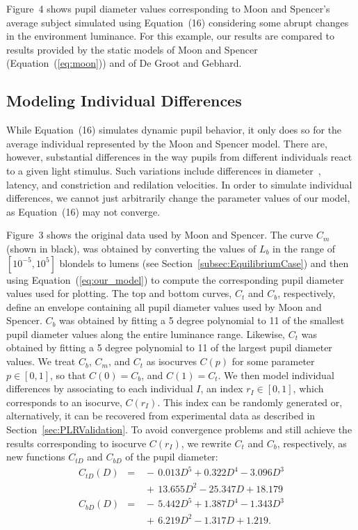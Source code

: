 \documentclass{acmtog} %
\begin{document}
Figure~4 shows pupil diameter values corresponding to Moon and Spencer's average
subject simulated using Equation~(16) considering some abrupt changes in the environment luminance.
For this example, our results are compared to results provided by the static models of Moon and Spencer
(Equation~(\ref{eq:moon})) and of De Groot and Gebhard.
%

\subsection{Modeling Individual Differences}
\label{subsec:Variations}

While Equation~(16) simulates dynamic pupil behavior, it only does so
for the average individual represented by the Moon and Spencer model.
There are, however, substantial differences in the way pupils from
different individuals react to a given light stimulus. Such variations
include differences in diameter~\cite{google}, latency, and constriction
and redilation velocities. In order to simulate individual differences,
we cannot just arbitrarily change the parameter values of our model, as
Equation~(16) may not converge.

Figure~3 shows the original data used by Moon and Spencer. The curve
$C_m$ (shown in black), was obtained by converting the values of $L_b$
in the range of $[10^{-5}, 10^{5}]$ blondels to lumens (see
Section~\ref{subsec:EquilibriumCase}) and then using
Equation~(\ref{eq:our_model}) to compute the corresponding pupil
diameter values used for plotting. The top and bottom curves, $C_t$ and
$C_b$, respectively, define an envelope containing all pupil diameter
values used by Moon and Spencer. $C_b$ was obtained by fitting a 5
degree polynomial to 11 of the smallest pupil diameter values along the
entire luminance range. Likewise, $C_t$ was obtained by fitting a 5
degree polynomial to 11 of the largest pupil diameter values. We treat
$C_b$, $C_m$, and $C_t$ as isocurves $C(p)$ for some parameter $p \in
[0,1]$, so that $C(0) = C_b$, and $C(1) = C_t$. We then model individual
differences by associating to each individual $I$, an index $r_I \in
[0,1]$, which corresponds to an isocurve, $C(r_I)$. This index can be
randomly generated or, alternatively, it can be recovered from
experimental data as described in Section~\ref{sec:PLRValidation}. To
avoid convergence problems and still achieve the results corresponding
to isocurve $C(r_I)$, we rewrite $C_t$ and $C_b$, respectively, as new
functions $C_{tD}$ and $C_{bD}$ of the pupil diameter:
\begin{eqnarray}
\label{eq:ctD}
  C_{tD}(D) &=& \,{-}\,0.013 D^5  +  0.322 D^4 - 3.096 D^3\nonumber\\
              &&\,{+}\,13.655 D^2 - 25.347 D + 18.179\\
\label{eq:cbD}
  C_{bD}(D) &=& \,{-}\,5.442 D^5 + 1.387 D^4 - 1.343 D^3\nonumber\\
              &&\,{+}\,6.219 D^2 - 1.317 D   + 1.219.
\end{eqnarray}
%
\end{document}
